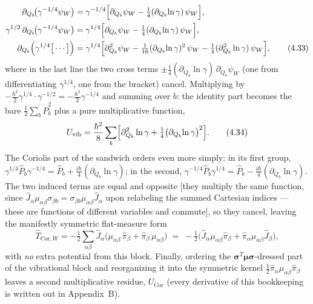\begin{align}
\partial_{Q_b}\!\bigl(\gamma^{-1/4}\psi_W\bigr)&=\gamma^{-1/4}\Bigl[\partial_{Q_b}\psi_W-\tfrac14(\partial_{Q_b}\!\ln\gamma)\,\psi_W\Bigr],\nonumber\\
\gamma^{1/2}\,\partial_{Q_b}\!\bigl(\gamma^{-1/4}\psi_W\bigr)&=\gamma^{1/4}\Bigl[\partial_{Q_b}\psi_W-\tfrac14(\partial_{Q_b}\!\ln\gamma)\,\psi_W\Bigr],\nonumber\\
\partial_{Q_b}\Bigl(\gamma^{1/4}\bigl[\,\cdots\,\bigr]\Bigr)&=\gamma^{1/4}\Bigl[\partial_{Q_b}^{2}\psi_W-\tfrac{1}{16}(\partial_{Q_b}\!\ln\gamma)^{2}\,\psi_W-\tfrac14(\partial_{Q_b}^{2}\ln\gamma)\,\psi_W\Bigr], \tag{4.33}
\end{align}
where in the last line the two cross terms $\pm\tfrac14(\partial_{Q_b}\ln\gamma)\,\partial_{Q_b}\psi_W$ (one from differentiating $\gamma^{1/4}$, one from the bracket) cancel. Multiplying by $-\tfrac{\hbar^2}{2}\gamma^{1/4}\cdot\gamma^{-1/2}=-\tfrac{\hbar^2}{2}\gamma^{-1/4}$ and summing over $b$: the identity part becomes the bare $\tfrac12\sum_b\hat P_b^2$ plus a pure multiplicative function,
\begin{equation}
U_{\mathrm{vib}}=\frac{\hbar^{2}}{8}\sum_b\Bigl[\partial_{Q_b}^{2}\ln\gamma+\tfrac14\bigl(\partial_{Q_b}\!\ln\gamma\bigr)^{2}\Bigr]. \tag{4.34}
\end{equation}
The Coriolis part of the sandwich orders even more simply: in its first group, $\gamma^{1/4}\hat P_b\gamma^{-1/4}=\hat P_b+\tfrac{i\hbar}{4}(\partial_{Q_b}\ln\gamma)$; in the second, $\gamma^{-1/4}\hat P_b\gamma^{1/4}=\hat P_b-\tfrac{i\hbar}{4}(\partial_{Q_b}\ln\gamma)$. The two induced terms are equal and opposite [they multiply the same function, since $\hat J_\alpha\mu_{\alpha\beta}\sigma_{\beta b}=\sigma_{\beta b}\mu_{\alpha\beta}\hat J_\alpha$ upon relabeling the summed Cartesian indices --- these are functions of different variables and commute], so they cancel, leaving the manifestly symmetric flat-measure form
\begin{equation}
\hat T_{\mathrm{Cor},W}=-\tfrac12\sum_{\alpha\beta}\hat J_\alpha\bigl(\mu_{\alpha\beta}\,\hat\pi_\beta+\hat\pi_\beta\,\mu_{\alpha\beta}\bigr)
\;=\;-\tfrac12\bigl(\hat J_\alpha\mu_{\alpha\beta}\hat\pi_\beta+\hat\pi_\alpha\mu_{\alpha\beta}\hat J_\beta\bigr), \tag{4.35}
\end{equation}
with \emph{no} extra potential from this block. Finally, ordering the $\boldsymbol\sigma^{T}\boldsymbol\mu\boldsymbol\sigma$-dressed part of the vibrational block and reorganizing it into the symmetric kernel $\tfrac12\hat\pi_\alpha\mu_{\alpha\beta}\hat\pi_\beta$ leaves a second multiplicative residue, $U_{\mathrm{Cor}}$ (every derivative of this bookkeeping is written out in Appendix~B).

